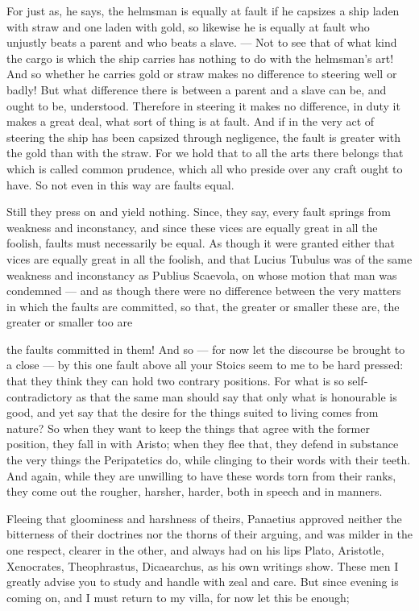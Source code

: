  For just as, he says, the helmsman is equally at fault if he capsizes a ship laden with straw and one laden with gold, so likewise he is equally at fault who unjustly beats a parent and who beats a slave. — Not to see that of what kind the cargo is which the ship carries has nothing to do with the helmsman's art! And so whether he carries gold or straw makes no difference to steering well or badly! But what difference there is between a parent and a slave can be, and ought to be, understood. Therefore in steering it makes no difference, in duty it makes a great deal, what sort of thing is at fault. And if in the very act of steering the ship has been capsized through negligence, the fault is greater with the gold than with the straw. For we hold that to all the arts there belongs that which is called common prudence, which all who preside over any craft ought to have. So not even in this way are faults equal.

 Still they press on and yield nothing. Since, they say, every fault springs from weakness and inconstancy, and since these vices are equally great in all the foolish, faults must necessarily be equal. As though it were granted either that vices are equally great in all the foolish, and that Lucius Tubulus was of the same weakness and inconstancy as Publius Scaevola, on whose motion that man was condemned — and as though there were no difference between the very matters in which the faults are committed, so that, the greater or smaller these are, the greater or smaller too are

 the faults committed in them! And so — for now let the discourse be brought to a close — by this one fault above all your Stoics seem to me to be hard pressed: that they think they can hold two contrary positions. For what is so self-contradictory as that the same man should say that only what is honourable is good, and yet say that the desire for the things suited to living comes from nature? So when they want to keep the things that agree with the former position, they fall in with Aristo; when they flee that, they defend in substance the very things the Peripatetics do, while clinging to their words with their teeth. And again, while they are unwilling to have these words torn from their ranks, they come out the rougher, harsher, harder, both in speech and in manners.

 Fleeing that gloominess and harshness of theirs, Panaetius approved neither the bitterness of their doctrines nor the thorns of their arguing, and was milder in the one respect, clearer in the other, and always had on his lips Plato, Aristotle, Xenocrates, Theophrastus, Dicaearchus, as his own writings show. These men I greatly advise you to study and handle with zeal and care. But since evening is coming on, and I must return to my villa, for now let this be enough;

